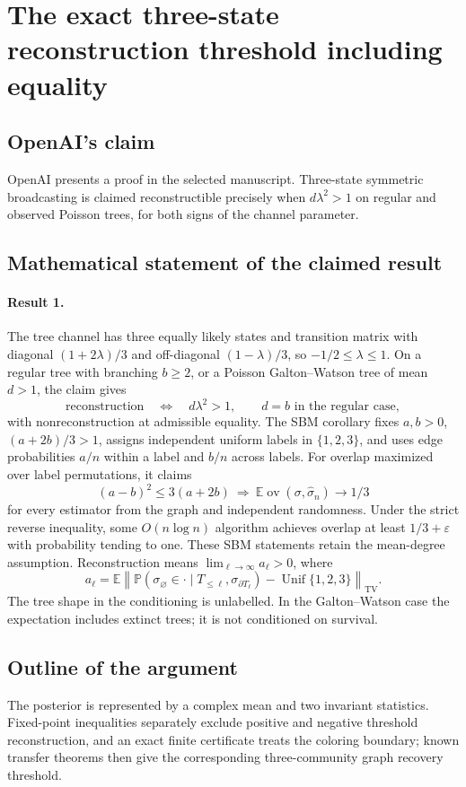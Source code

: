 \documentclass[11pt]{article}
\begin{document}
\section*{The exact three-state reconstruction threshold including equality}

\subsection{OpenAI's claim}
OpenAI presents a proof in the selected manuscript. Three-state symmetric broadcasting is claimed reconstructible precisely when $d\lambda^2>1$ on regular and observed Poisson trees, for both signs of the channel parameter.

\subsection{Mathematical statement of the claimed result}
\paragraph{Result 1.} The tree channel has three equally likely states and transition matrix with diagonal \((1+2\lambda)/3\) and off-diagonal \((1-\lambda)/3\), so \(-1/2\le\lambda\le1\). On a regular tree with branching \(b\ge2\), or a Poisson Galton--Watson tree of mean \(d>1\), the claim gives
\[
 \text{reconstruction}\quad\Longleftrightarrow\quad d\lambda^2>1,
 \qquad d=b\text{ in the regular case},
\]
with nonreconstruction at admissible equality. The SBM corollary fixes \(a,b>0\), \((a+2b)/3>1\), assigns independent uniform labels in \(\{1,2,3\}\), and uses edge probabilities \(a/n\) within a label and \(b/n\) across labels. For overlap maximized over label permutations, it claims
\[
 (a-b)^2\le3(a+2b)\ \Longrightarrow\
 \mathbb E\operatorname{ov}(\sigma,\widehat\sigma_n)\to1/3
\]
for every estimator from the graph and independent randomness. Under the strict reverse inequality, some \(O(n\log n)\) algorithm achieves overlap at least \(1/3+\varepsilon\) with probability tending to one. These SBM statements retain the mean-degree assumption. Reconstruction means $\lim_{\ell\to\infty}a_\ell>0$, where
\[
 a_\ell=\mathbb E\left\|\mathbb P(\sigma_{\varnothing}\in\cdot\mid T_{\le\ell},\sigma_{\partial T_\ell})-\operatorname{Unif}\{1,2,3\}\right\|_{\mathrm{TV}}.
\]
The tree shape in the conditioning is unlabelled. In the Galton--Watson case the expectation includes extinct trees; it is not conditioned on survival.

\subsection{Outline of the argument}
The posterior is represented by a complex mean and two invariant statistics. Fixed-point inequalities separately exclude positive and negative threshold reconstruction, and an exact finite certificate treats the coloring boundary; known transfer theorems then give the corresponding three-community graph recovery threshold.
\end{document}
